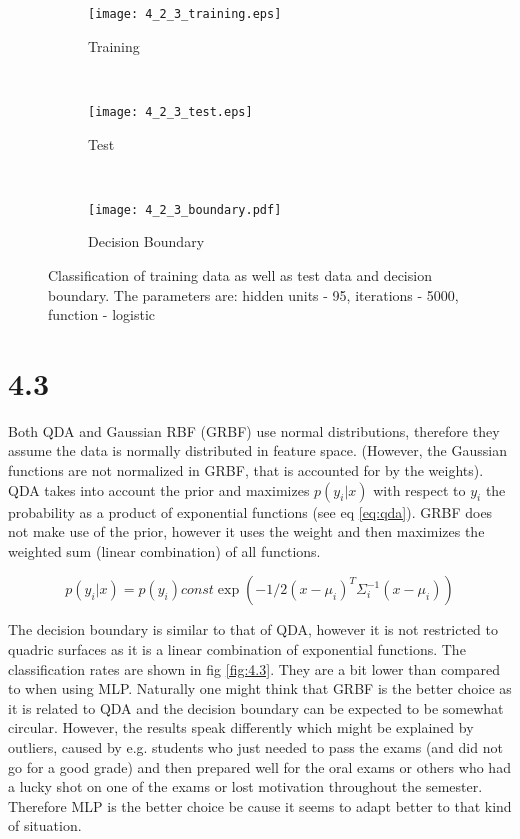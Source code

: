 \documentclass[a4paper,11pt]{article}
\theoremstyle{definition}
\theoremstyle{plain}
\theoremstyle{remark}
\begin{document}
\begin{figure}
\centering
\begin{subfigure}[b]{0.31\textwidth}
\centering
\texttt{[image: 4\_2\_3\_training.eps]}
\caption{Training}
\end{subfigure}
~
\begin{subfigure}[b]{0.31\textwidth}
\centering
\texttt{[image: 4\_2\_3\_test.eps]}
\caption{Test}
\end{subfigure}
~
\begin{subfigure}[b]{0.31\textwidth}
\centering
\texttt{[image: 4\_2\_3\_boundary.pdf]}
\caption{Decision Boundary}
\end{subfigure}

\caption{Classification of training data as well as test data and decision boundary. The parameters are: hidden units - 95, iterations - 5000, function - logistic}
\label{fig:4.2.3}
\end{figure}

\clearpage
\section*{4.3}

Both QDA and Gaussian RBF (GRBF) use normal distributions, therefore they assume the data is normally distributed in feature space. (However, the Gaussian functions are not normalized in GRBF, that is accounted for by the weights). QDA takes into account the prior and maximizes $p(y_i|x)$ with respect to $y_i$ the probability as a product of exponential functions (see eq \ref{eq:qda}). GRBF does not make use of the prior, however it uses the weight and then maximizes the weighted sum (linear combination) of all functions. 

\begin{equation}
p(y_i|x) = p(y_i)const\exp(-1/2(x-\mu_i)^T\Sigma_i^{-1}(x-\mu_i))
\label{eq:qda}
\end{equation}

The decision boundary is similar to that of QDA, however it is not restricted to quadric surfaces as it is a linear combination of exponential functions. The classification rates are shown in fig \ref{fig:4.3}. They are a bit lower than compared to when using MLP. Naturally one might think that GRBF is the better choice as it is related to QDA and the decision boundary can be expected to be somewhat circular. However, the results speak differently which might be explained by outliers, caused by e.g. students who just needed to pass the exams (and did not go for a good grade) and then prepared well for the oral exams or others who had a lucky shot on one of the exams or lost motivation throughout the semester. Therefore MLP is the better choice be cause it seems to adapt better to that kind of situation.
\end{document}
